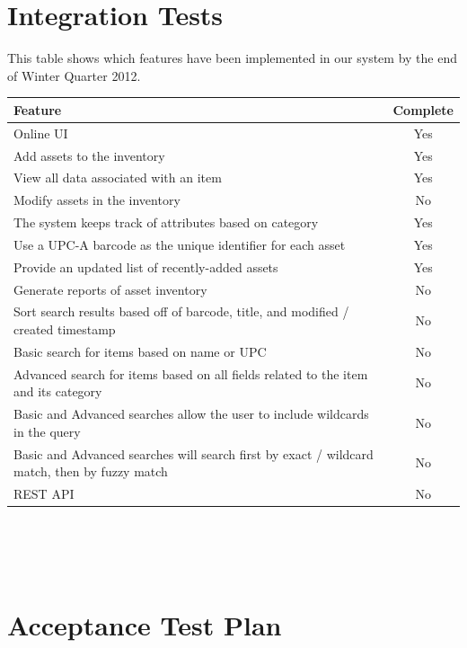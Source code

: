 \documentclass{article}
\begin{document}
\section{Integration Tests}
This table shows which features have been implemented in our system by the end of Winter Quarter 2012.\\
\begin{tabular}{| l | c |}
\hline
\textbf{Feature}\label{feature} & \textbf{Complete}\\
\hline
\hline
Online UI & Yes \\
\hline
Add assets to the inventory & Yes \\
\hline
View all data associated with an item & Yes \\
\hline
Modify assets in the inventory & No \\
\hline
The system keeps track of attributes based on category & Yes \\
\hline
Use a UPC-A\label{upc} barcode as the unique identifier for each asset & Yes \\
\hline
Provide an updated list of recently-added assets & Yes \\
\hline
Generate reports of asset inventory & No \\
\hline
Sort search results based off of barcode, title, and modified / created timestamp & No \\
\hline
Basic search for items based on name or UPC & No \\
\hline
Advanced search for items based on all fields related to the item and its category & No \\
\hline
Basic and Advanced searches allow the user to include wildcards in the query & No \\
\hline
Basic and Advanced searches will search first by exact\label{exact} / wildcard\label{wild} match, then by fuzzy match\label{fuzzy} & No \\
\hline
REST API & No \\
\hline
\end{tabular}\label{rest}\\ \\ \\

\section{Acceptance Test Plan}
\label{test_case}
\end{document}
